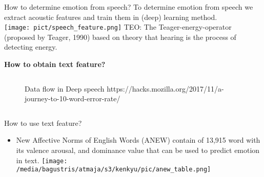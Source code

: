 \documentclass[aspectratio=169]{beamer}
\begin{document}
\begin{frame}[t, fragile]{How to determine emotion from speech?}
To determine emotion from speech we extract acoustic features and train them in (deep) 
learning method.\\
\texttt{[image: pict/speech\_feature.png]}
\newline
TEO: The Teager-energy-operator (proposed by Teager, 1990) based on theory that 
hearing is the process of detecting energy.
\end{frame}

\begin{frame}[t, fragile]
\textbf{How to obtain text feature?}
\begin{columns}
	\begin{figure} 
	\caption{\small {Data flow in Deep speech}  
	\tiny{https://hacks.mozilla.org/2017/11/a-journey-to-10-word-error-rate/}}
	\end{figure} 
\end{columns}
\end{frame}

\begin{frame}[t, fragile]{How to use text feature?}
\begin{itemize}
\item New Affective Norms of English Words (ANEW\footnotemark) contain of 13,915 word with its valence
      arousal, and dominance value that can be used to predict emotion in text.
\texttt{[image: /media/bagustris/atmaja/s3/kenkyu/pic/anew\_table.png]}
\end{itemize}
\end{frame}
\end{document}
